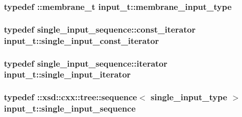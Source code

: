 \subsubsection[{\texorpdfstring{membrane\+\_\+input\+\_\+type}{membrane_input_type}}]{\setlength{\rightskip}{0pt plus 5cm}typedef \+::{\bf membrane\+\_\+t} {\bf input\+\_\+t\+::membrane\+\_\+input\+\_\+type}}\hypertarget{classinput__t_aa72abd8e01641f20e6fdb3d5d0bf99ca}{}\label{classinput__t_aa72abd8e01641f20e6fdb3d5d0bf99ca}
\subsubsection[{\texorpdfstring{single\+\_\+input\+\_\+const\+\_\+iterator}{single_input_const_iterator}}]{\setlength{\rightskip}{0pt plus 5cm}typedef single\+\_\+input\+\_\+sequence\+::const\+\_\+iterator {\bf input\+\_\+t\+::single\+\_\+input\+\_\+const\+\_\+iterator}}\hypertarget{classinput__t_ac6c5ac99d56764bfdf61d747cd2c2074}{}\label{classinput__t_ac6c5ac99d56764bfdf61d747cd2c2074}
\subsubsection[{\texorpdfstring{single\+\_\+input\+\_\+iterator}{single_input_iterator}}]{\setlength{\rightskip}{0pt plus 5cm}typedef single\+\_\+input\+\_\+sequence\+::iterator {\bf input\+\_\+t\+::single\+\_\+input\+\_\+iterator}}\hypertarget{classinput__t_a001a8bb6bb06d71002249f491bc628fa}{}\label{classinput__t_a001a8bb6bb06d71002249f491bc628fa}
\subsubsection[{\texorpdfstring{single\+\_\+input\+\_\+sequence}{single_input_sequence}}]{\setlength{\rightskip}{0pt plus 5cm}typedef \+::xsd\+::cxx\+::tree\+::sequence$<$ {\bf single\+\_\+input\+\_\+type} $>$ {\bf input\+\_\+t\+::single\+\_\+input\+\_\+sequence}}\hypertarget{classinput__t_a1296075494d97da854dc2be8b1022061}{}\label{classinput__t_a1296075494d97da854dc2be8b1022061}
